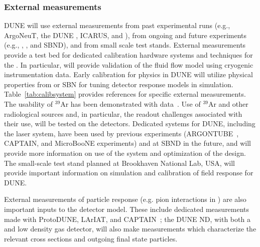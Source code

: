 \subsubsection{External measurements} 

DUNE will use external measurements from past experimental runs (e.g., ArgoNeuT, the DUNE , ICARUS, and \lariat), from ongoing and future experiments (e.g., , , and SBND), and from small scale  test stands. External measurements provide a test bed for dedicated calibration hardware systems and techniques for the . In particular,  will provide validation of the fluid flow model using cryogenic instrumentation data. 
Early calibration for physics in DUNE will utilize \lar physical properties from  or SBN  for tuning detector response models in simulation. Table~\ref{tab:calibsystem} provides  references for specific external measurements. The usability of ${}^{39}$Ar has been demonstrated with \microboone data~\cite{MICROBOONE-NOTE-1050-PUB}. 
Use of  ${}^{39}$Ar  and other radiological sources and, in particular, the  readout challenges associated with their use, will be tested on the  detectors. Dedicated systems for DUNE, 
including the laser system, have been used by previous experiments (ARGONTUBE~\cite{Zeller:2013sva,Ereditato:2014lra}, CAPTAIN, and MicroBooNE experiments) and at SBND in the future, and will provide more information on use of the system and optimization of the design.  The small-scale \lar test stand planned at Brookhaven National Lab, USA, will provide important information on simulation and calibration of field response for DUNE.

External measurements of particle response (e.g. pion interactions in ) are also important inputs to the detector model. These include dedicated measurements made with ProtoDUNE, LArIAT, and CAPTAIN~\cite{Bhandari:2019rat}; the DUNE ND, with both a  and low density gas detector, will also make measurements which characterize the relevant cross sections and outgoing final state particles.


